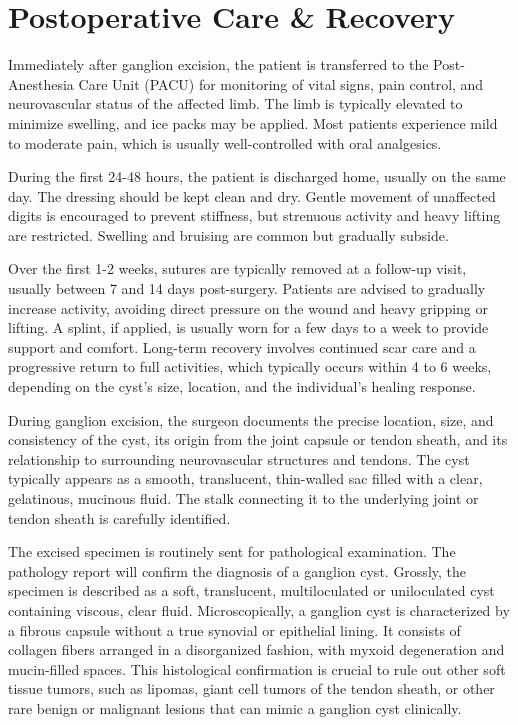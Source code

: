 \section*{Postoperative Care \& Recovery}
Immediately after ganglion excision, the patient is transferred to the Post-Anesthesia Care Unit (PACU) for monitoring of vital signs, pain control, and neurovascular status of the affected limb. The limb is typically elevated to minimize swelling, and ice packs may be applied. Most patients experience mild to moderate pain, which is usually well-controlled with oral analgesics.

During the first 24-48 hours, the patient is discharged home, usually on the same day. The dressing should be kept clean and dry. Gentle movement of unaffected digits is encouraged to prevent stiffness, but strenuous activity and heavy lifting are restricted. Swelling and bruising are common but gradually subside. 

Over the first 1-2 weeks, sutures are typically removed at a follow-up visit, usually between 7 and 14 days post-surgery. Patients are advised to gradually increase activity, avoiding direct pressure on the wound and heavy gripping or lifting. A splint, if applied, is usually worn for a few days to a week to provide support and comfort. Long-term recovery involves continued scar care and a progressive return to full activities, which typically occurs within 4 to 6 weeks, depending on the cyst's size, location, and the individual's healing response.

During ganglion excision, the surgeon documents the precise location, size, and consistency of the cyst, its origin from the joint capsule or tendon sheath, and its relationship to surrounding neurovascular structures and tendons. The cyst typically appears as a smooth, translucent, thin-walled sac filled with a clear, gelatinous, mucinous fluid. The stalk connecting it to the underlying joint or tendon sheath is carefully identified.

The excised specimen is routinely sent for pathological examination. The pathology report will confirm the diagnosis of a ganglion cyst. Grossly, the specimen is described as a soft, translucent, multiloculated or uniloculated cyst containing viscous, clear fluid. Microscopically, a ganglion cyst is characterized by a fibrous capsule without a true synovial or epithelial lining. It consists of collagen fibers arranged in a disorganized fashion, with myxoid degeneration and mucin-filled spaces. This histological confirmation is crucial to rule out other soft tissue tumors, such as lipomas, giant cell tumors of the tendon sheath, or other rare benign or malignant lesions that can mimic a ganglion cyst clinically.


